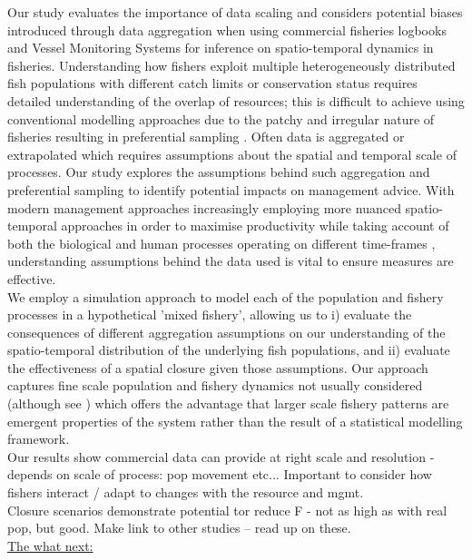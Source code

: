 \documentclass[review]{elsarticle}
\begin{document}
Our study evaluates the importance of data scaling and considers potential
biases introduced through data aggregation when using commercial fisheries
logbooks and Vessel Monitoring Systems for inference on spatio-temporal
dynamics in fisheries. Understanding how fishers exploit multiple
heterogeneously distributed fish populations with different catch limits or
conservation status requires detailed understanding of the overlap of
resources; this is difficult to achieve using conventional modelling approaches
due to the patchy and irregular nature of fisheries resulting in preferential
sampling \cite{Martinez-Minaya2018}. Often data is aggregated or extrapolated
which requires assumptions about the spatial and temporal scale of processes.
Our study explores the assumptions behind such aggregation and preferential
sampling to identify potential impacts on management advice. With modern
management approaches increasingly employing more nuanced spatio-temporal
approaches in order to maximise productivity while taking account of both the
biological and human processes operating on different time-frames
\cite{Dunn2016}, understanding assumptions behind the data used is vital to
ensure measures are effective. \\

We employ a simulation approach to model each of the population and fishery
processes in a hypothetical 'mixed fishery', allowing us to i) evaluate the
consequences of different aggregation assumptions on our understanding of the
spatio-temporal distribution of the underlying fish populations, and ii)
evaluate the effectiveness of a spatial closure given those assumptions. Our
approach captures fine scale population and fishery dynamics not usually
considered (although see \cite{Bastardie2010, Bailey2018}) which offers the
advantage that larger scale fishery patterns are emergent properties of the
system rather than the result of a statistical modelling framework. \\

Our results show commercial data can provide at right scale and resolution -
depends on scale of process: pop movement etc... Important to consider how
fishers interact / adapt to changes with the resource and mgmt. \\

Closure scenarios demonstrate potential tor reduce F - not as high as with real
pop, but good.  Make link to other studies -- read up on these. \\

\underline{The what next:} \\
\end{document}
